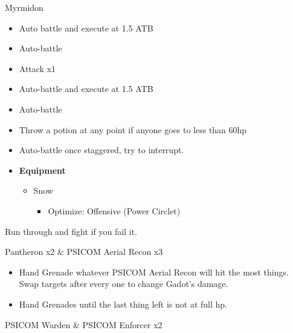 
\begin{battle}{Myrmidon}
\begin{itemize}
    \item Auto battle and execute at 1.5 ATB
    \item Auto-battle
    \item Attack x1
    \item Auto-battle and execute at 1.5 ATB
    \item Auto-battle
    \item Throw a potion at any point if anyone goes to less than 60hp
    \item Auto-battle once staggered, try to interrupt.
\end{itemize}

\end{battle}


\begin{menu}
\begin{itemize}
    \item \textbf{Equipment}
    \begin{itemize}
        \item Snow
        \begin{itemize}
            \item Optimize: Offensive (Power Circlet)
        \end{itemize}
    \end{itemize}
\end{itemize}
\end{menu}

Run through and fight if you fail it.

\begin{battle}{Pantheron x2 \& PSICOM Aerial Recon x3}
\begin{itemize}
    \item Hand Grenade whatever PSICOM Aerial Recon will hit the most things. Swap targets after every one to change Gadot's damage.
    \item Hand Grenades until the last thing left is not at full hp.
\end{itemize}

\end{battle}

\begin{battle}{PSICOM Warden \& PSICOM Enforcer x2}
\end{battle}

